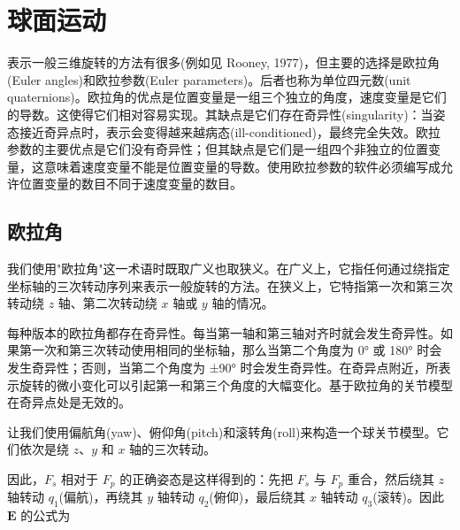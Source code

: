 \documentclass[10pt,a4paper]{book}
\theoremstyle{thmstyle} %
\theoremstyle{defstyle} %
\theoremstyle{prostyle} %
\begin{document}
\section{球面运动}





表示一般三维旋转的方法有很多(例如见 Rooney, 1977)，但主要的选择是欧拉角(Euler angles)和欧拉参数(Euler parameters)。后者也称为单位四元数(unit quaternions)。欧拉角的优点是位置变量是一组三个独立的角度，速度变量是它们的导数。这使得它们相对容易实现。其缺点是它们存在奇异性(singularity)：当姿态接近奇异点时，表示会变得越来越病态(ill-conditioned)，最终完全失效。欧拉参数的主要优点是它们没有奇异性；但其缺点是它们是一组四个非独立的位置变量，这意味着速度变量不能是位置变量的导数。使用欧拉参数的软件必须编写成允许位置变量的数目不同于速度变量的数目。



\subsection{欧拉角}





我们使用"欧拉角"这一术语时既取广义也取狭义。在广义上，它指任何通过绕指定坐标轴的三次转动序列来表示一般旋转的方法。在狭义上，它特指第一次和第三次转动绕 $z$ 轴、第二次转动绕 $x$ 轴或 $y$ 轴的情况。



每种版本的欧拉角都存在奇异性。每当第一轴和第三轴对齐时就会发生奇异性。如果第一次和第三次转动使用相同的坐标轴，那么当第二个角度为 0° 或 180° 时会发生奇异性；否则，当第二个角度为 ±90° 时会发生奇异性。在奇异点附近，所表示旋转的微小变化可以引起第一和第三个角度的大幅变化。基于欧拉角的关节模型在奇异点处是无效的。



让我们使用偏航角(yaw)、俯仰角(pitch)和滚转角(roll)来构造一个球关节模型。它们依次是绕 $z$、$y$ 和 $x$ 轴的三次转动。



因此，$F_{s}$ 相对于 $F_{p}$ 的正确姿态是这样得到的：先把 $F_{s}$ 与 $F_{p}$ 重合，然后绕其 $z$ 轴转动 $q_{1}$(偏航)，再绕其 $y$ 轴转动 $q_{2}$(俯仰)，最后绕其 $x$ 轴转动 $q_{3}$(滚转)。因此 $\boldsymbol{E}$ 的公式为
\end{document}
